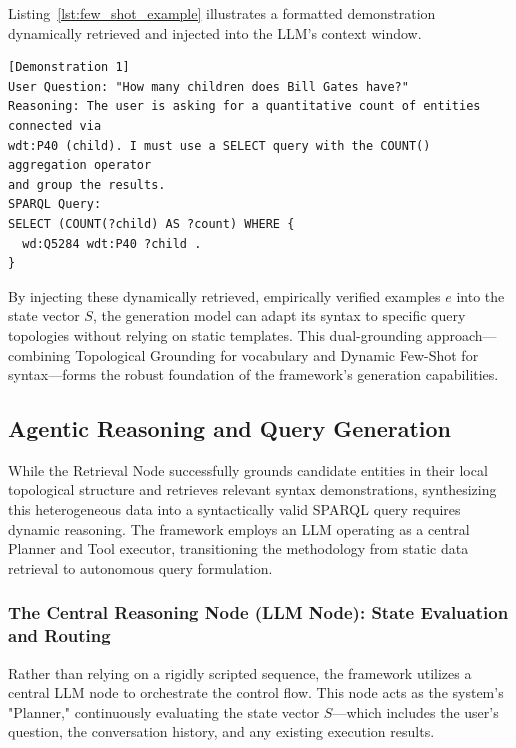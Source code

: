 Listing~\ref{lst:few_shot_example} illustrates a formatted demonstration dynamically retrieved and injected into the LLM's context window.

\noindent
\begin{minipage}{\textwidth}
\begin{lstlisting}[basicstyle=\ttfamily\footnotesize, frame=single, caption={Example of a dynamically retrieved Few-Shot demonstration injected into the LLM prompt to teach aggregation syntax.}, label={lst:few_shot_example}]
[Demonstration 1]
User Question: "How many children does Bill Gates have?"
Reasoning: The user is asking for a quantitative count of entities connected via 
wdt:P40 (child). I must use a SELECT query with the COUNT() aggregation operator 
and group the results.
SPARQL Query: 
SELECT (COUNT(?child) AS ?count) WHERE { 
  wd:Q5284 wdt:P40 ?child . 
}
\end{lstlisting}
\end{minipage}

By injecting these dynamically retrieved, empirically verified examples $e$ into the state vector $S$, the generation model can adapt its syntax to specific query topologies without relying on static templates. This dual-grounding approach—combining Topological Grounding for vocabulary and Dynamic Few-Shot for syntax—forms the robust foundation of the framework's generation capabilities.

\subsection{Agentic Reasoning and Query Generation}
\label{sec:agentic_generation}

While the Retrieval Node successfully grounds candidate entities in their local topological structure and retrieves relevant syntax demonstrations, synthesizing this heterogeneous data into a syntactically valid SPARQL query requires dynamic reasoning. The framework employs an LLM operating as a central Planner and Tool executor, transitioning the methodology from static data retrieval to autonomous query formulation.

\subsubsection{The Central Reasoning Node (LLM Node): State Evaluation and Routing}
Rather than relying on a rigidly scripted sequence, the framework utilizes a central LLM node to orchestrate the control flow. This node acts as the system's "Planner," continuously evaluating the state vector $S$—which includes the user's question, the conversation history, and any existing execution results.

